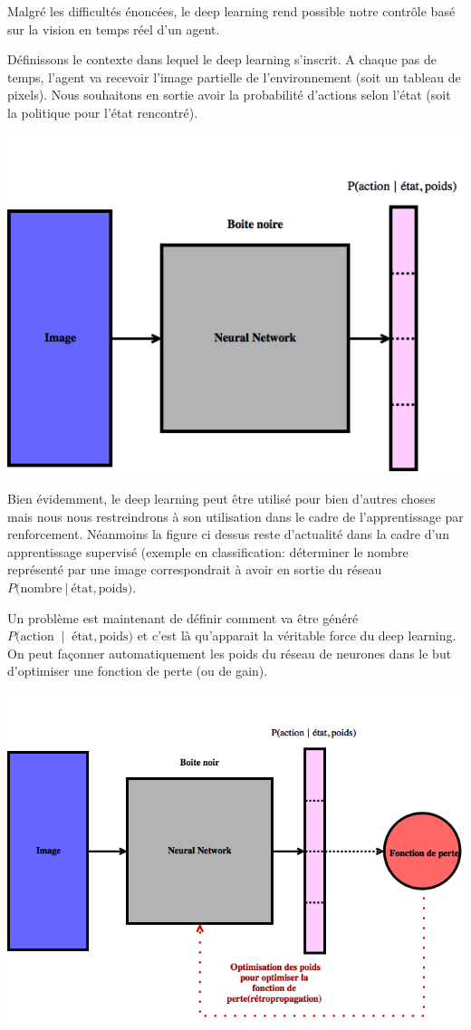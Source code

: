 Malgré les difficultés énoncées, le deep learning rend possible notre contrôle basé sur la vision en temps réel d'un agent. 


Définissons le contexte dans lequel le deep learning s'inscrit. A chaque pas de temps, l'agent va recevoir l'image partielle de l'environnement (soit un tableau de pixels). Nous souhaitons en sortie avoir la probabilité d'actions selon l'état (soit la politique pour l'état rencontré).

\begin{center}

\includegraphics[width=.4\linewidth]{./assets/DeepLearning/dl}
\end{center}

Bien évidemment, le deep learning peut être utilisé pour bien d'autres choses mais nous nous restreindrons à son utilisation dans le cadre de l'apprentissage par renforcement. Néanmoins la figure ci dessus reste d'actualité dans la cadre d'un apprentissage supervisé (exemple en classification: déterminer le nombre représenté par une image correspondrait à avoir en sortie du réseau $P(\text{nombre} \:\vert\: \text{état}, \text{poids)}$. 

Un problème est maintenant de définir comment va être généré  $P(\text{action } \:\vert\: \text{ état}, \text{poids)}$ et c'est là qu'apparait la véritable force du deep learning. On peut façonner automatiquement les poids du réseau de neurones dans le but d'optimiser une fonction de perte (ou de gain).

\begin{center}
\includegraphics[width=.55\linewidth]{./assets/DeepLearning/dl2}
\end{center}

